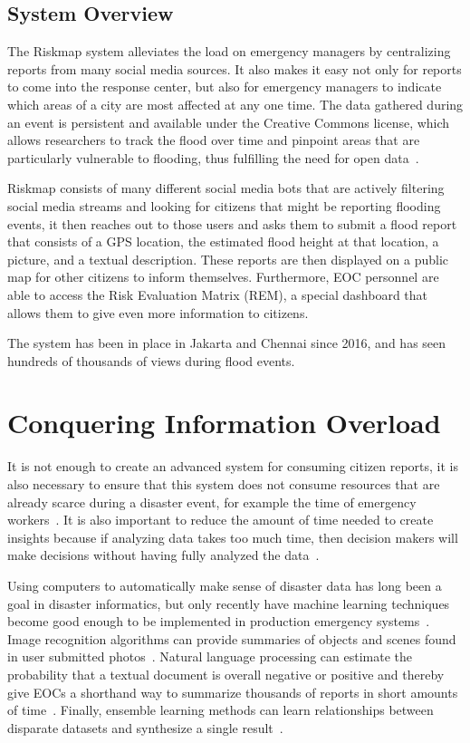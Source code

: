 	\subsection{System Overview}
	The Riskmap system alleviates the load on emergency managers by
	centralizing reports from many social media sources. It also makes it
	easy not only for reports to come into the response center, but also for
	emergency managers to indicate which areas of a city are most affected
	at any one time. The data gathered during an event is persistent and
	available under the Creative Commons license, which allows researchers
	to track the flood over time and pinpoint areas that are particularly
	vulnerable to flooding, thus fulfilling the need for open data~\cite{holdernessSocialMediaGeoSocial2015a}.

	Riskmap consists of many different social media bots that are actively
	filtering social media streams and looking for citizens that might be
	reporting flooding events, it then reaches out to those users and asks
	them to submit a flood report that consists of a GPS location, the
	estimated flood height at that location, a picture, and a textual
	description. These reports are then displayed on a public map for other
	citizens to inform themselves. Furthermore, EOC personnel are able to
	access the Risk Evaluation Matrix (REM), a special dashboard that allows
	them to give even more information to citizens.
	
	The system has been in place in Jakarta and Chennai since 2016, and has seen
	hundreds of thousands of views during flood events.

\section{Conquering Information Overload}
	It is not enough to create an advanced system for consuming citizen
	reports, it is also necessary to ensure that this system does not
	consume resources that are already scarce during a disaster event, for
	example the time of emergency
	workers~\cite{aminDataNaturalDisasters2008}. It is also important to
	reduce the amount of time needed to create insights because if analyzing
	data takes too much time, then decision makers will make decisions
	without having fully analyzed the
	data~\cite{quarantelliUrbanVulnerabilityDisasters2003}.

	Using computers to automatically make sense of disaster data has long
	been a goal in disaster informatics, but only recently have machine
	learning techniques become good enough to be implemented in production
	emergency systems~\cite{meierDigitalHumanitariansHow2015}. Image
	recognition algorithms can provide summaries of objects and scenes found
	in user submitted photos~\cite{nguyenRapidClassificationCrisisRelated,
	donahueDeCAFDeepConvolutional2013}. Natural language processing can
	estimate the probability that a textual document is overall negative or
	positive and thereby give EOCs a shorthand way to summarize thousands of
	reports in short amounts of
	time~\cite{nguyenRapidClassificationCrisisRelated,
	nagyCrowdSentimentDetection2012}. Finally, ensemble learning methods can
	learn relationships between disparate datasets and synthesize a single
	result~\cite{mouzannarDamageIdentificationSocial2018}.
